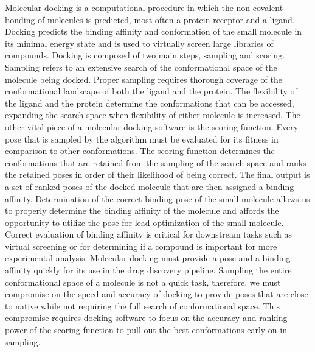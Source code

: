 \documentclass[journal=jcisd8,manuscript=article]{achemso}
\begin{document}
Molecular docking is a computational procedure in which the non-covalent bonding of molecules is predicted, most often a protein receptor and a ligand. Docking predicts the binding affinity and conformation of the small molecule in its minimal energy state and is used to virtually screen large libraries of compounds\cite{kitchen2004docking,leach2006prediction,lyu2019ultra}. Docking is composed of two main steps, sampling and scoring. Sampling refers to an extensive search of the conformational space of the molecule being docked. Proper sampling requires thorough coverage of the conformational landscape of both the ligand and the protein. The flexibility of the ligand and the protein determine the conformations that can be accessed, expanding the search space when flexibility of either molecule is increased. The other vital piece of a molecular docking software is the scoring function. Every pose that is sampled by the algorithm must be evaluated for its fitness in comparison to other conformations. The scoring function determines the conformations that are retained from the sampling of the search space and ranks the retained poses in order of their likelihood of being correct. The final output is a set of ranked poses of the docked molecule that are then assigned a binding affinity. Determination of the correct binding pose of the small molecule allows us to properly determine the binding affinity of the molecule and affords the opportunity to utilize the pose for lead optimization of the small molecule. Correct evaluation of binding affinity is critical for downstream tasks such as virtual screening or for determining if a compound is important for more experimental analysis. Molecular docking must provide a pose and a binding affinity quickly for its use in the drug discovery pipeline. Sampling the entire conformational space of a molecule is not a quick task, therefore, we must compromise on the speed and accuracy of docking to provide poses that are close to native while not requiring the full search of conformational space. This compromise requires docking software to focus on the accuracy and ranking power of the scoring function to pull out the best conformations early on in sampling.
\end{document}
